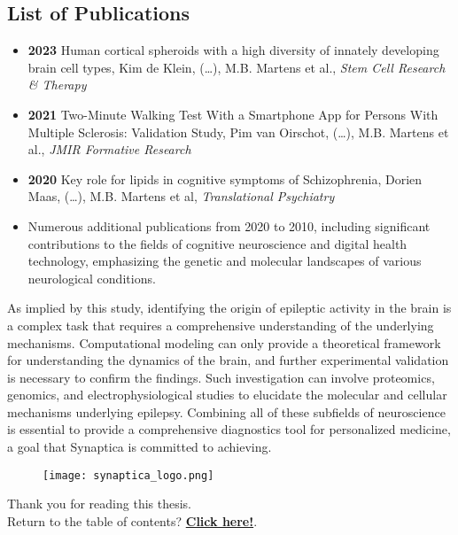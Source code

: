\subsection*{List of Publications}
\begin{itemize}
    \item \textbf{2023} Human cortical spheroids with a high diversity of innately developing brain cell types, Kim de Klein, (\dots), M.B. Martens et al., \textit{Stem Cell Research \& Therapy}
    \item \textbf{2021} Two-Minute Walking Test With a Smartphone App for Persons With Multiple Sclerosis: Validation Study, Pim van Oirschot, (\dots), M.B. Martens et al., \textit{JMIR Formative Research}
    \item \textbf{2020} Key role for lipids in cognitive symptoms of Schizophrenia, Dorien Maas, (\dots), M.B. Martens et al, \textit{Translational Psychiatry}
    \item Numerous additional publications from 2020 to 2010, including significant contributions to the fields of cognitive neuroscience and digital health technology, emphasizing the genetic and molecular landscapes of various neurological conditions.
\end{itemize}

\noindent As implied by this study, identifying the origin of epileptic activity in the brain is a complex task that requires a comprehensive understanding of the underlying mechanisms.
Computational modeling can only provide a theoretical framework for understanding the dynamics of the brain, and further experimental validation is necessary to confirm the findings.
Such investigation can involve proteomics, genomics, and electrophysiological studies to elucidate the molecular and cellular mechanisms underlying epilepsy.
Combining all of these subfields of neuroscience is essential to provide a comprehensive diagnostics tool for personalized medicine, a goal that Synaptica is committed to achieving.
\vspace{12pt}
\begin{figure}[htbp]
    \centering
    \texttt{[image: synaptica\_logo.png]}
\end{figure}

\vspace*{\fill} %

\begin{center} %
    Thank you for reading this thesis.\\
    Return to the table of contents? \hyperlink{toc}{\textbf{Click here!}}.
\end{center}

\vspace*{\fill} %